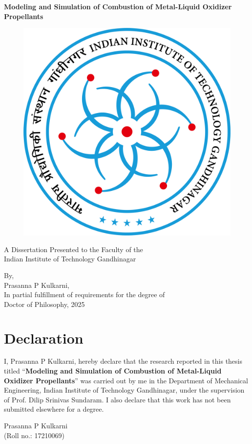\documentclass[12pt]{report}
\newcommand{\thTitle}{Modeling and Simulation of Combustion of Metal-Liquid Oxidizer Propellants}
\begin{document}
\begin{center}
    \LARGE
    \singlespacing
    \textbf{\thTitle}
\end{center}

\vspace{15mm}
\begin{figure}[h]
    \centering
    \includegraphics[width=0.4\linewidth]{Images/IITGN_logo.png}
\end{figure}
\begin{center}
    \large
    A Dissertation Presented to the Faculty of the \\
    Indian Institute of Technology Gandhinagar
\end{center}

\vspace{15mm}
\begin{flushleft}
    \large
    By, \\
    {
    Prasanna P Kulkarni, \\
    In partial fulfillment of requirements for the degree of \\
    \vspace{-1mm}
    Doctor of Philosophy, 2025
    }
\end{flushleft}


\chapter*{Declaration}
I, Prasanna P Kulkarni, hereby declare that the research reported in this thesis titled ``\textbf{\thTitle}'' was carried out by me in the Department of Mechanical Engineering, Indian Institute of Technology Gandhinagar, under the supervision of Prof. Dilip Srinivas Sundaram. I also declare that this work has not been submitted elsewhere for a degree.

\begin{flushright}
    Prasanna P Kulkarni \\
    (Roll no.: 17210069)
\end{flushright}
\end{document}
